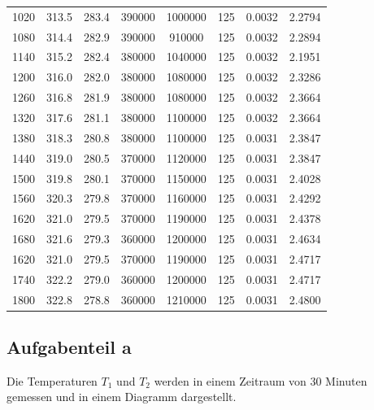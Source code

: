 \begin{table}[H]
\begin{tabular}{c c c c c c c c}
    1020  &  313.5 &  283.4 & 390000  & 1000000 & 125 & 0.0032 & 2.2794 \\
    1080  &  314.4 &  282.9 & 390000  &  910000 & 125 & 0.0032 & 2.2894 \\
    1140  &  315.2 &  282.4 & 380000  & 1040000 & 125 & 0.0032 & 2.1951 \\
    1200  &  316.0 &  282.0 & 380000  & 1080000 & 125 & 0.0032 & 2.3286 \\
    1260  &  316.8 &  281.9 & 380000  & 1080000 & 125 & 0.0032 & 2.3664 \\
    1320  &  317.6 &  281.1 & 380000  & 1100000 & 125 & 0.0032 & 2.3664 \\
    1380  &  318.3 &  280.8 & 380000  & 1100000 & 125 & 0.0031 & 2.3847 \\
    1440  &  319.0 &  280.5 & 370000  & 1120000 & 125 & 0.0031 & 2.3847 \\
    1500  &  319.8 &  280.1 & 370000  & 1150000 & 125 & 0.0031 & 2.4028 \\
    1560  &  320.3 &  279.8 & 370000  & 1160000 & 125 & 0.0031 & 2.4292 \\
    1620  &  321.0 &  279.5 & 370000  & 1190000 & 125 & 0.0031 & 2.4378 \\
    1680  &  321.6 &  279.3 & 360000  & 1200000 & 125 & 0.0031 & 2.4634 \\
    1620  &  321.0 &  279.5 & 370000  & 1190000 & 125 & 0.0031 & 2.4717 \\
    1740  &  322.2 &  279.0 & 360000  & 1200000 & 125 & 0.0031 & 2.4717 \\
    1800  &  322.8 &  278.8 & 360000  & 1210000 & 125 & 0.0031 & 2.4800 \\
    \bottomrule
  \end{tabular}
\end{table}
\subsection{Aufgabenteil a}
Die Temperaturen $T_1$ und $T_2$ werden in einem Zeitraum von 30 Minuten gemessen und in einem Diagramm dargestellt.


